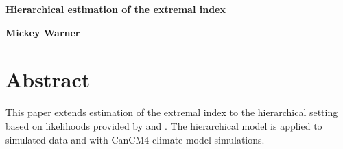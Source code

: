 \begin{Large}
\noindent \textbf{Hierarchical estimation of the extremal index}
\end{Large}
\bigskip

\noindent \textbf{Mickey Warner}

\section{Abstract}
\label{abstract}

This paper extends estimation of the extremal index to the hierarchical setting based on likelihoods provided by \cite{ferro2003inference} and \cite{suveges2007likelihood}.            The hierarchical model is applied to simulated data and with CanCM4 climate model simulations.
